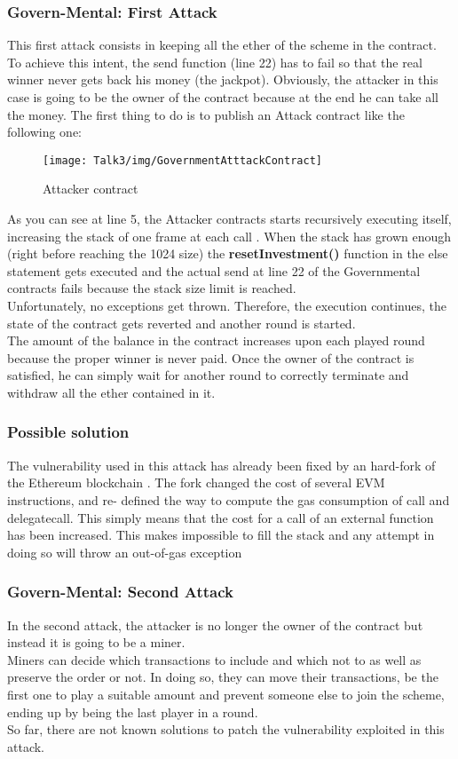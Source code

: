 \subsubsection{Govern-Mental: First Attack}
This first attack consists in keeping all the ether of the scheme in the contract. To achieve this intent, the send function (line 22) has to fail so that the real winner never gets back his money (the jackpot).
Obviously, the attacker in this case is going to be the owner of the contract because at the end he can take all the money.
The first thing to do is to publish an Attack contract like the following one:
\begin{figure}[H]
\begin{center}
\texttt{[image: Talk3/img/GovernmentAtttackContract]}
\end{center}
\caption{Attacker contract}
\label{label}
\end{figure}
As you can see at line 5, the Attacker contracts starts recursively executing itself, increasing the stack of one frame at each call \cite{paper2}.
When the stack has grown enough (right before reaching the 1024 size) the \textbf{resetInvestment()} function in the else statement gets executed and the actual send at line 22 of the Governmental contracts fails because the stack size limit is reached.\\
Unfortunately, no exceptions get thrown. Therefore, the execution continues, the state of the contract gets reverted and another round is started.\\
The amount of the balance in the contract increases upon each played round because the proper winner is never paid. Once the owner of the contract is satisfied, he can simply wait for another round to correctly terminate and withdraw all the ether contained in it.
\subsubsection{Possible solution}
The vulnerability used in this attack has already been fixed by an hard-fork of the Ethereum blockchain \cite{hardfork}. The fork changed the cost of several EVM instructions, and re- defined the way to compute the gas consumption of call and delegatecall\cite{paper2}.
This simply means that the cost for a call of an external function has been increased. This makes impossible to fill the stack and any attempt in doing so will throw an out-of-gas exception
\subsubsection{Govern-Mental: Second Attack}
In the second attack, the attacker is no longer the owner of the contract but instead it is going to be a miner.\\
Miners can decide which transactions to include and which not to as well as preserve the order or not\cite{paper2}. In doing so, they can move their transactions, be the first one to play a suitable amount and prevent someone else to join the scheme, ending up by being the last player in a round.\\
So far, there are not known solutions to patch the vulnerability exploited in this attack.


